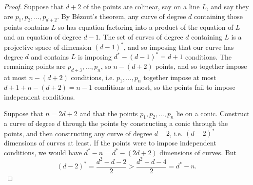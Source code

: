 \begin{proof}
Suppose that \(d+2\) of the points are colinear, say on a line \(L\), and say they are \(p_1,p_2,\dots,p_{d+2}\).
By B\'ezout's theorem, any curve of degree \(d\) containing those points contains \(L\) so has equation factoring into a product of the equation of \(L\) and an equation of degree \(d-1\).
The set of curves of degree \(d\) containing \(L\) is a projective space of dimension \((d-1)^*\), and so imposing that our curve has degree \(d\) and contains \(L\) is imposing \(d^*-(d-1)^*=d+1\) conditions.
The remaining points are \(p_{d+3},\dots,p_n\), so \(n-(d+2)\) points, and so together impose at most \(n-(d+2)\) conditions, i.e. \(p_1,\dots,p_n\) together impose at most \(d+1+n-(d+2)=n-1\) conditions at most, so the points fail to impose independent conditions.

Suppose that \(n=2d+2\) and that the points \(p_1,p_2,\dots,p_n\) lie on a conic.
Construct a curve of degree \(d\) through the points by constructing a conic through the points, and then constructing any curve of degree \(d-2\), i.e. \((d-2)^*\) dimensions of curves at least.
If the points were to impose independent conditions, we would have \(d^*-n=d^*-(2d+2)\) dimensions of curves.
But
\[
(d-2)^* = \frac{d^2-d-2}{2} > \frac{d^2-d-4}{2} = d^*-n.
\]


\end{proof}
